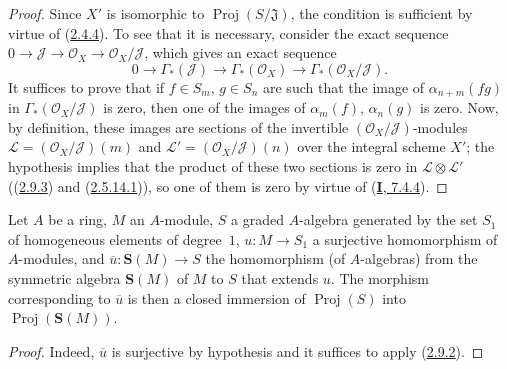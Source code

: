 
\begin{proof}
Since $X'$ is isomorphic to $\operatorname{Proj}(S/\mathfrak{J})$, the
condition is sufficient by virtue of (\hyperref[II.2.4.4]{2.4.4}). To see
that it is necessary, consider the exact sequence
$0\to\mathcal{J}\to\mathcal{O}_X\to\mathcal{O}_X/\mathcal{J}$, which gives an
exact sequence
\[
  0\longrightarrow\Gamma_*(\mathcal{J})
  \longrightarrow\Gamma_*(\mathcal{O}_X)
  \longrightarrow\Gamma_*(\mathcal{O}_X/\mathcal{J}).
\]
It suffices to prove that if $f\in S_m$, $g\in S_n$ are such that the image of
$\alpha_{n+m}(fg)$ in $\Gamma_*(\mathcal{O}_X/\mathcal{J})$ is zero,
then one of the images of $\alpha_m(f)$, $\alpha_n(g)$ is zero. Now, by
definition, these images are sections of the invertible
$(\mathcal{O}_X/\mathcal{J})$-modules
$\mathcal{L}=(\mathcal{O}_X/\mathcal{J})(m)$ and
$\mathcal{L}'=(\mathcal{O}_X/\mathcal{J})(n)$ over the integral scheme
$X'$; the hypothesis implies that the product of these two sections is zero
in $\mathcal{L}\otimes\mathcal{L}'$
((\hyperref[II.2.9.3]{2.9.3}) and
(\hyperref[II.2.5.14.1]{2.5.14.1})), so one of them is zero by virtue of
(\hyperref[I.7.4.4]{\textbf{I}, 7.4.4}).
\end{proof}

\begin{corollary}[2.9.5]
\label{II.2.9.5}
Let $A$ be a ring, $M$ an $A$-module, $S$ a graded $A$-algebra generated by
the set $S_1$ of homogeneous elements of degree~$1$, $u:M\to S_1$ a
surjective homomorphism of $A$-modules, and
$\overline{u}:\mathbf{S}(M)\to S$ the homomorphism (of $A$-algebras) from the
symmetric algebra $\mathbf{S}(M)$ of $M$ to $S$ that extends $u$. The
morphism corresponding to $\overline{u}$ is then a closed immersion of
$\operatorname{Proj}(S)$ into $\operatorname{Proj}(\mathbf{S}(M))$.
\end{corollary}

\begin{proof}
Indeed, $\overline{u}$ is surjective by hypothesis and it suffices to apply
(\hyperref[II.2.9.2]{2.9.2}).
\end{proof}

